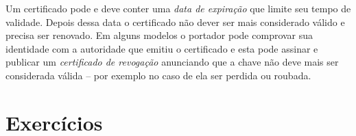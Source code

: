 Um certificado pode e deve conter uma {\em data de expiração} que limite seu tempo de validade.
Depois dessa data o certificado não dever ser mais considerado válido e precisa ser renovado.
Em alguns modelos o portador pode comprovar sua identidade com a autoridade que emitiu o certificado e esta pode assinar e publicar um {\em certificado de revogação} anunciando que a chave não deve mais ser considerada válida -- por exemplo no caso de ela ser perdida ou roubada.


\section{Exercícios}
\label{sec:exercicios}




